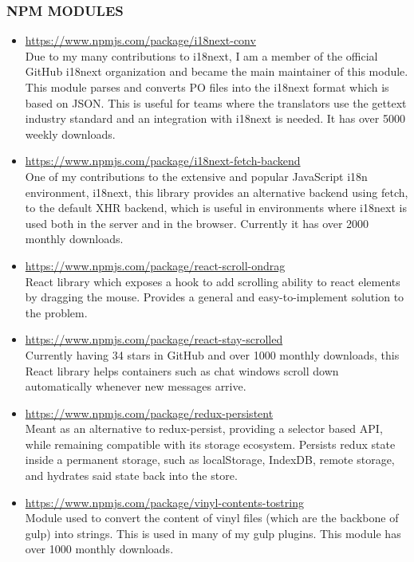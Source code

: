 \documentclass{res}
\begin{document}
\begin{resume}
\subsubsection{NPM MODULES}

\begin{itemize}
  \item \url{https://www.npmjs.com/package/i18next-conv} \\
  Due to my many contributions to i18next, I am a member of the official
  GitHub i18next organization and became the main maintainer of this module.
  This module parses and converts PO files into the i18next format which
  is based on JSON. This is useful for teams where the translators use
  the gettext industry standard and an integration with i18next is needed.
  It has over 5000 weekly downloads.

  \item \url{https://www.npmjs.com/package/i18next-fetch-backend} \\
  One of my contributions to the extensive and popular JavaScript i18n
  environment, i18next, this library provides an alternative backend
  using fetch, to the default XHR backend, which is useful in environments
  where i18next is used both in the server and in the browser.
  Currently it has over 2000 monthly downloads.

  \item \url{https://www.npmjs.com/package/react-scroll-ondrag} \\
  React library which exposes a hook to add scrolling ability to react
  elements by dragging the mouse. Provides a general and easy-to-implement
  solution to the problem.

  \item \url{https://www.npmjs.com/package/react-stay-scrolled} \\
  Currently having 34 stars in GitHub and over 1000 monthly downloads,
  this React library helps containers such as chat windows scroll down
  automatically whenever new messages arrive.

  \item \url{https://www.npmjs.com/package/redux-persistent} \\
  Meant as an alternative to redux-persist, providing a selector based API,
  while remaining compatible with its storage ecosystem. Persists redux state
  inside a permanent storage, such as localStorage, IndexDB, remote storage,
  and hydrates said state back into the store.

  \item \url{https://www.npmjs.com/package/vinyl-contents-tostring} \\
  Module used to convert the content of vinyl files (which are the backbone
  of gulp) into strings. This is used in many of my gulp plugins.
  This module has over 1000 monthly downloads.


\end{itemize}
\end{resume}
\end{document}
